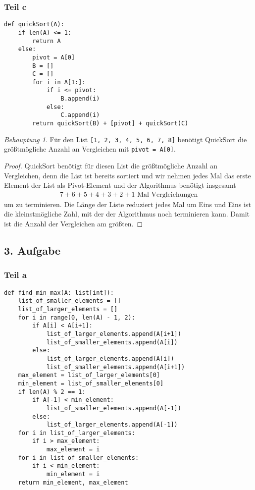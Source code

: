 \documentclass[draft,a5paper]{article}
\theoremstyle{remark}
\newtheorem*{Behauptung}{Behauptung}
\begin{document}
\subsubsection{Teil c}
\begin{verbatim}
def quickSort(A):
    if len(A) <= 1:
        return A
    else:
        pivot = A[0]
        B = []
        C = []
        for i in A[1:]:
            if i <= pivot:
                B.append(i)
            else:
                C.append(i)
        return quickSort(B) + [pivot] + quickSort(C)
\end{verbatim}
\begin{Behauptung}
  Für den List \texttt{[1, 2, 3, 4, 5, 6, 7, 8]}
benötigt QuickSort die größtmögliche Anzahl an
Vergleichen mit \texttt{pivot = A[0]}.
\end{Behauptung}
\begin{proof}
  QuickSort benötigt für diesen List die größtmögliche
Anzahl an Vergleichen, denn die List ist bereits sortiert
und wir nehmen jedes Mal das erste Element der List als
Pivot-Element und der Algorithmus benötigt insgesamt
\begin{align*}
7+6+5+4+3+2+1 \text{ Mal Vergleichungen}
\end{align*}
um zu terminieren.  Die Länge der Liste reduziert jedes
Mal um Eins und Eins ist die kleinstmögliche Zahl, mit
der der Algorithmus noch terminieren kann.  Damit ist
die Anzahl der Vergleichen am größten.
\end{proof}
\subsection{3. Aufgabe}
\subsubsection{Teil a}
\begin{verbatim}
def find_min_max(A: list[int]):
    list_of_smaller_elements = []
    list_of_larger_elements = []
    for i in range(0, len(A) - 1, 2):
        if A[i] < A[i+1]:
            list_of_larger_elements.append(A[i+1])
            list_of_smaller_elements.append(A[i])
        else:
            list_of_larger_elements.append(A[i])
            list_of_smaller_elements.append(A[i+1])
    max_element = list_of_larger_elements[0]
    min_element = list_of_smaller_elements[0]
    if len(A) % 2 == 1:
        if A[-1] < min_element:
            list_of_smaller_elements.append(A[-1])
        else:
            list_of_larger_elements.append(A[-1])
    for i in list_of_larger_elements:
        if i > max_element:
            max_element = i
    for i in list_of_smaller_elements:
        if i < min_element:
            min_element = i
    return min_element, max_element
\end{verbatim}
\end{document}
